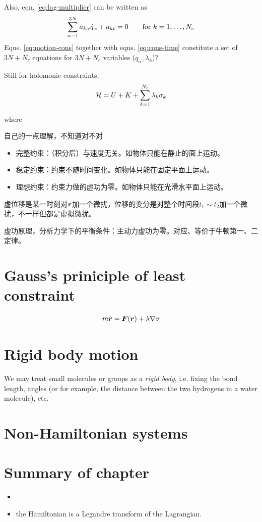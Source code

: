 Also, eqn. \ref{eq:lag-multiplier} can be written as
\begin{equation}
	\sum_{\alpha=1}^{3N} a_{k\alpha}\dot{q}_\alpha+a_{kt}=0
	\qquad \text{for}\ k=1,\dots,N_c
	\label{eq:cons-time}
\end{equation}
Eqns. \ref{eq:motion-cons} together with eqns. \ref{eq:cons-time} constitute a set of $3N+N_c$ equations for $3N+N_c$ variables ($q_\alpha, \lambda_k$)?

Still for holomonic constraints,
\begin{equation}
	\mathcal{H}=U+K+\sum_{k=1}^{N_c}\lambda_k\sigma_k
\end{equation}

where





\supplement 自己的一点理解，不知道对不对

\begin{itemize}
	\item 完整约束：（积分后）与速度无关。如物体只能在静止的面上运动。
	\item 稳定约束：约束不随时间变化。如物体只能在固定平面上运动。
	\item 理想约束：约束力做的虚功为零。如物体只能在光滑水平面上运动。
\end{itemize}

虚位移是某一时刻对$\boldsymbol{r}$加一个微扰，位移的变分是对整个时间段$t_1\sim t_2$加一个微扰，不一样但都是虚拟微扰。

虚功原理，分析力学下的平衡条件：主动力虚功为零。对应、等价于牛顿第一、二定律。

\section{Gauss's priniciple of least constraint}

\begin{equation}
	m\dot{\dot{\boldsymbol{r}}}=\boldsymbol{F}(\boldsymbol{r})+\lambda\nabla\sigma
\end{equation}

\section{Rigid body motion}
We may treat small molecules or groups as a \textit{rigid body}, i.e. fixing the bond length, angles (or for example, the distance between the two hydrogens in a water molecule), etc.


\section{Non-Hamiltonian systems}


\section{}


\section{Summary of chapter}

\begin{itemize}
	\item 
	\item the Hamiltonian is a Legandre transform of the Lagrangian.
\end{itemize}